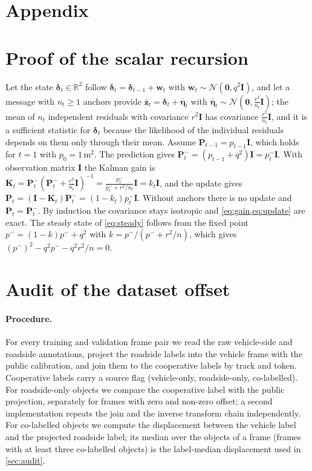 \section*{Appendix}

\section{Proof of the scalar recursion}
\label{app:proof}
Let the state $\boldsymbol\delta_t\in\mathbb R^2$ follow $\boldsymbol\delta_t=\boldsymbol\delta_{t-1}+\mathbf w_t$ with $\mathbf w_t\sim\mathcal N(\mathbf 0,q^2\mathbf I)$, and let a message with $n_t\ge1$ anchors provide $\bar{\mathbf z}_t=\boldsymbol\delta_t+\bar{\boldsymbol\eta}_t$ with $\bar{\boldsymbol\eta}_t\sim\mathcal N(\mathbf 0,\tfrac{r^2}{n_t}\mathbf I)$; the mean of $n_t$ independent residuals with covariance $r^2\mathbf I$ has covariance $\tfrac{r^2}{n_t}\mathbf I$, and it is a sufficient statistic for $\boldsymbol\delta_t$ because the likelihood of the individual residuals depends on them only through their mean.
Assume $\mathbf P_{t-1}=p_{t-1}\mathbf I$, which holds for $t=1$ with $p_0=1$\,m$^2$.
The prediction gives $\mathbf P_t^-=(p_{t-1}+q^2)\mathbf I=p_t^-\mathbf I$.
With observation matrix $\mathbf I$ the Kalman gain is $\mathbf K_t=\mathbf P_t^-(\mathbf P_t^-+\tfrac{r^2}{n_t}\mathbf I)^{-1}=\tfrac{p_t^-}{p_t^-+r^2/n_t}\mathbf I=k_t\mathbf I$, and the update gives $\mathbf P_t=(\mathbf I-\mathbf K_t)\mathbf P_t^-=(1-k_t)p_t^-\mathbf I$.
Without anchors there is no update and $\mathbf P_t=\mathbf P_t^-$.
By induction the covariance stays isotropic and \cref{eq:gain,eq:update} are exact.
The steady state of \cref{eq:steady} follows from the fixed point $p^-=(1-k)p^-+q^2$ with $k=p^-/(p^-+r^2/n)$, which gives $(p^-)^2-q^2p^--q^2r^2/n=0$.

\section{Audit of the dataset offset}
\label{app:audit}

\paragraph{Procedure.}
For every training and validation frame pair we read the raw vehicle-side and roadside annotations, project the roadside labels into the vehicle frame with the public calibration, and join them to the cooperative labels by track and token.
Cooperative labels carry a source flag (vehicle-only, roadside-only, co-labelled).
For roadside-only objects we compare the cooperative label with the public projection, separately for frames with zero and non-zero offset; a second implementation repeats the join and the inverse transform chain independently.
For co-labelled objects we compute the displacement between the vehicle label and the projected roadside label; its median over the objects of a frame (frames with at least three co-labelled objects) is the label-median displacement used in \cref{sec:audit}.

